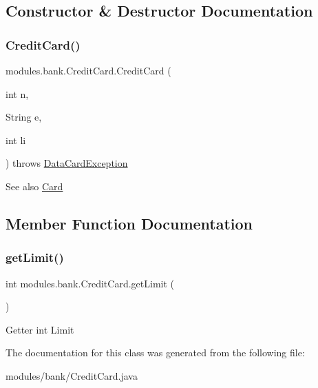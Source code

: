\subsection{Constructor \& Destructor Documentation}
\mbox{\label{classmodules_1_1bank_1_1_credit_card_a8e6b9ecf2a7bfa17d3ac713caa427320}} 
\subsubsection{\texorpdfstring{Credit\+Card()}{CreditCard()}}
{\footnotesize\ttfamily modules.\+bank.\+Credit\+Card.\+Credit\+Card (\begin{DoxyParamCaption}\item[{int}]{n,  }\item[{String}]{e,  }\item[{int}]{li }\end{DoxyParamCaption}) throws \mbox{\hyperlink{classsystem_1_1exceptions_1_1_data_card_exception}{Data\+Card\+Exception}}\hspace{0.3cm}{\ttfamily [inline]}}

\begin{DoxySeeAlso}{See also}
\mbox{\hyperlink{classmodules_1_1bank_1_1_card}{Card}} 
\end{DoxySeeAlso}


\subsection{Member Function Documentation}
\mbox{\label{classmodules_1_1bank_1_1_credit_card_a370decd7fd4895c200d38045ba60d939}} 
\subsubsection{\texorpdfstring{get\+Limit()}{getLimit()}}
{\footnotesize\ttfamily int modules.\+bank.\+Credit\+Card.\+get\+Limit (\begin{DoxyParamCaption}{ }\end{DoxyParamCaption})\hspace{0.3cm}{\ttfamily [inline]}}

Getter int Limit 

The documentation for this class was generated from the following file\+:\begin{DoxyCompactItemize}
\item 
modules/bank/Credit\+Card.\+java\end{DoxyCompactItemize}
